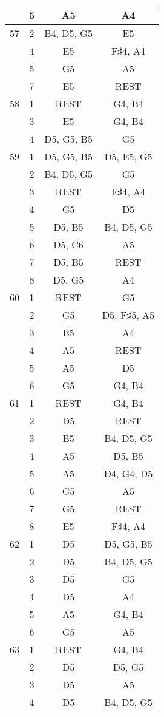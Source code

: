 \documentclass{article}
\begin{document}
\begin{longtable}{|c|c|c|c|}
  & 5 & A5 & A4 \\ 
\hline
57 & 2 & B4, D5, G5 & E5 \\ 
  & 4 & E5 & F♯4, A4 \\ 
  & 5 & G5 & A5 \\ 
  & 7 & E5 & REST \\ 
\hline
58 & 1 & REST & G4, B4 \\ 
  & 3 & E5 & G4, B4 \\ 
  & 4 & D5, G5, B5 & G5 \\ 
\hline
59 & 1 & D5, G5, B5 & D5, E5, G5 \\ 
  & 2 & B4, D5, G5 & G5 \\ 
  & 3 & REST & F♯4, A4 \\ 
  & 4 & G5 & D5 \\ 
  & 5 & D5, B5 & B4, D5, G5 \\ 
  & 6 & D5, C6 & A5 \\ 
  & 7 & D5, B5 & REST \\ 
  & 8 & D5, G5 & A4 \\ 
\hline
60 & 1 & REST & G5 \\ 
  & 2 & G5 & D5, F♯5, A5 \\ 
  & 3 & B5 & A4 \\ 
  & 4 & A5 & REST \\ 
  & 5 & A5 & D5 \\ 
  & 6 & G5 & G4, B4 \\ 
\hline
61 & 1 & REST & G4, B4 \\ 
  & 2 & D5 & REST \\ 
  & 3 & B5 & B4, D5, G5 \\ 
  & 4 & A5 & D5, B5 \\ 
  & 5 & A5 & D4, G4, D5 \\ 
  & 6 & G5 & A5 \\ 
  & 7 & G5 & REST \\ 
  & 8 & E5 & F♯4, A4 \\ 
\hline
62 & 1 & D5 & D5, G5, B5 \\ 
  & 2 & D5 & B4, D5, G5 \\ 
  & 3 & D5 & G5 \\ 
  & 4 & D5 & A4 \\ 
  & 5 & A5 & G4, B4 \\ 
  & 6 & G5 & A5 \\ 
\hline
63 & 1 & REST & G4, B4 \\ 
  & 2 & D5 & D5, G5 \\ 
  & 3 & D5 & A5 \\ 
  & 4 & D5 & B4, D5, G5 \\ 

\end{longtable}
\end{document}
